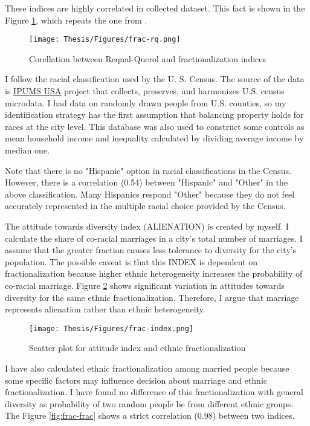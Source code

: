 \documentclass[12pt]{article}
\begin{document}
These indices are highly correlated in collected dataset. This fact is shown in the Figure \ref{fig:rq-frac}, which repeats the one from \cite{Reynal-Querol}.

\begin{figure}[h!]
    \centering
    \texttt{[image: Thesis/Figures/frac-rq.png]}
    \caption{Corellation between Reqnal-Querol and fractionalization indices}
    \label{fig:rq-frac}
\end{figure}

I follow the racial classification used by the U. S. Census. The source of the data is \hyperlink{https://usa.ipums.org/usa/}{IPUMS USA}  project that collects, preserves, and harmonizes U.S. census microdata. I had data on randomly drawn people from U.S. counties, so my identification strategy has the first assumption that balancing property holds for races at the city level. This database was also used to construct some controls as mean household income and inequality calculated by dividing average income by median one.

Note that there is no "Hispanic" option in racial classifications in the Census. However, there is a correlation (0.54) between "Hispanic" and "Other" in the above classification. Many Hispanics respond "Other" because they do not feel accurately represented in the multiple racial choice provided by the Census.

The attitude towards diversity index (ALIENATION) is created by myself. I calculate the share of co-racial marriages in a city's total number of marriages. I assume that the greater fraction causes less tolerance to diversity for the city's population. The possible caveat is that this INDEX is dependent on fractionalization because higher ethnic heterogeneity increases the probability of co-racial marriage.
Figure \ref{fig:frac-index} shows significant variation in attitudes towards diversity for the same ethnic fractionalization. Therefore, I argue that marriage represents alienation rather than ethnic heterogeneity.

\begin{figure}[h!]
    \centering
    \texttt{[image: Thesis/Figures/frac-index.png]}
    \caption{Scatter plot for attitude index and ethnic fractionalization}
    \label{fig:frac-index}
\end{figure}

I have also calculated ethnic fractionalization among married people because some specific factors may influence decision about marriage and ethnic fractionalization. I have found no difference of this fractionalization with general diversity as probability of two random people be from different ethnic groups. The Figure \ref{fig:frac-frac} shows a strict correlation (0.98) between two indices.
\end{document}

